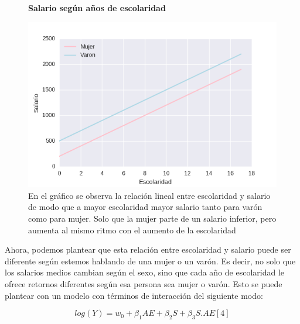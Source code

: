 \begin{figure}[h]
		\centering
		\textbf{Salario según años de escolaridad}\par\medskip
		\includegraphics[scale = 0.7]{../img/capitulo2/modelo3.png}
		\caption{En el gráfico se observa la relación lineal entre escolaridad y salario de modo que a mayor escolaridad mayor salario tanto para varón como para mujer. Solo que la mujer parte de un salario inferior, pero aumenta al mismo ritmo con el aumento de la escolaridad}
\end{figure}


Ahora, podemos plantear que esta relación entre escolaridad y salario puede ser diferente según estemos hablando de una mujer o un varón. Es decir, no solo que los salarios medios cambian según el sexo, sino que cada año de escolaridad le ofrece retornos diferentes según esa persona sea mujer o varón. Esto se puede plantear con un modelo con términos de interacción del siguiente modo:

$$log(Y) = w_0 + \beta_1 AE + \beta_2 S + \beta_3  S.AE [4] $$

